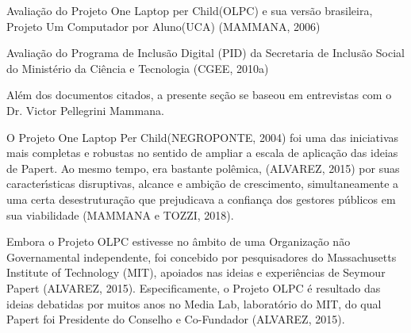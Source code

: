 \documentclass[
12pt,		%
openright,	%
twoside,  %
a4paper,			%
chapter=TITLE,		%
english,			%
french,				%
spanish,			%
brazil				%
]{USPSC-classe/USPSC}
\begin{document}
\begin{alineas}
\item Avalia\c{c}\~ao do Projeto \textquotedbl One Laptop per Child\textquotedbl  (OLPC) e sua vers\~ao brasileira, \textquotedbl Projeto Um Computador por Aluno\textquotedbl  (UCA)  (MAMMANA, 2006)
\item Avalia\c{c}\~ao do Programa de Inclus\~ao Digital (PID) da Secretaria de Inclus\~ao Social do Minist\'erio da Ci\^encia e Tecnologia  (CGEE, 2010a)
\end{alineas}

Al\'em dos documentos citados, a presente se\c{c}\~ao se baseou em entrevistas com o Dr. Victor Pellegrini Mammana.

















O Projeto \textquotedbl One Laptop Per Child\textquotedbl  (NEGROPONTE, 2004) foi uma das iniciativas mais completas e robustas no sentido de ampliar a escala de aplica\c{c}\~ao das ideias de Papert. Ao mesmo tempo, era bastante pol\^emica, (ALVAREZ, 2015) por suas caracter\'{\i}sticas disruptivas, alcance e ambi\c{c}\~ao de crescimento, simultaneamente a uma certa desestrutura\c{c}\~ao que prejudicava a confian\c{c}a dos gestores p\'ublicos em sua viabilidade (MAMMANA e TOZZI, 2018).

















Embora o Projeto OLPC estivesse no \^ambito de uma Organiza\c{c}\~ao n\~ao Governamental independente,  foi concebido por pesquisadores do Massachusetts Institute of Technology (MIT), apoiados nas ideias e experi\^encias de Seymour Papert  (ALVAREZ, 2015). Especificamente, o Projeto OLPC \'e resultado das ideias debatidas por muitos anos no Media Lab, laborat\'orio do MIT, do qual Papert foi Presidente do Conselho e Co-Fundador  (ALVAREZ, 2015).
\end{document}
